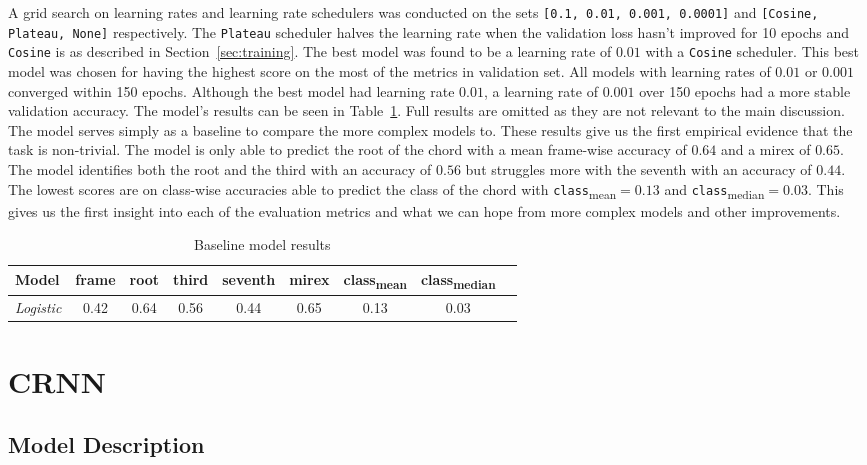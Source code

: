 A grid search on learning rates and learning rate schedulers was conducted on the sets \texttt{[0.1, 0.01, 0.001, 0.0001]} and \texttt{[Cosine, Plateau, None]} respectively. The \texttt{Plateau} scheduler halves the learning rate when the validation loss hasn't improved for 10 epochs and \texttt{Cosine} is as described in Section~\ref{sec:training}. The best model was found to be a learning rate of $0.01$ with a \texttt{Cosine} scheduler. This best model was chosen for having the highest score on the most of the metrics in validation set. All models with learning rates of $0.01$ or $0.001$ converged within 150 epochs. Although the best model had learning rate $0.01$, a learning rate of $0.001$ over 150 epochs had a more stable validation accuracy. The model's results can be seen in Table~\ref{tab:baseline_results}. Full results are omitted as they are not relevant to the main discussion. The model serves simply as a baseline to compare the more complex models to. These results give us the first empirical evidence that the task is non-trivial. The model is only able to predict the root of the chord with a mean frame-wise accuracy of $0.64$ and a mirex of $0.65$. The model identifies both the root and the third with an accuracy of $0.56$ but struggles more with the seventh with an accuracy of $0.44$. The lowest scores are on class-wise accuracies able to predict the class of the chord with \texttt{class}\textsubscript{mean}$=0.13$ and \texttt{class}\textsubscript{median}$=0.03$. This gives us the first insight into each of the evaluation metrics and what we can hope from more complex models and other improvements.

\begin{table}[H]
    \centering
    \begin{tabular}{lcccccccc}
        \toprule
        Model & frame & root & third & seventh & mirex & class\textsubscript{mean} & class\textsubscript{median} \\  
        \midrule
        \emph{Logistic} & 0.42 & 0.64 & 0.56 & 0.44 & 0.65 & 0.13 & 0.03 \\
        \bottomrule
    \end{tabular}
    \caption{Baseline model results}\label{tab:baseline_results}
\end{table}

\section{CRNN}
\subsection{Model Description}

